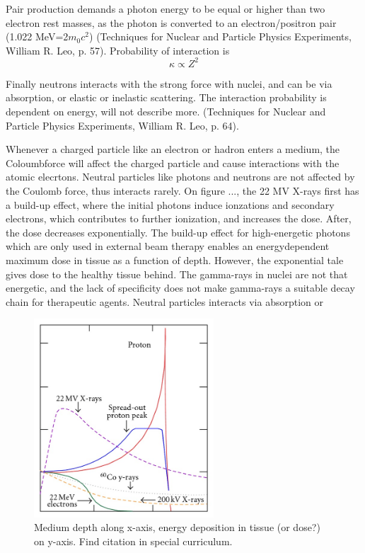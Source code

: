 Pair production demands a photon energy to be equal or higher than two electron rest  masses, as the photon is converted to an electron/positron pair (1.022 MeV=2$m_0c^2$) (Techniques for Nuclear and Particle Physics Experiments, William R. Leo, p. 57). Probability of interaction is \begin{equation}
    \kappa\propto Z^2
\end{equation}

Finally neutrons interacts with the strong force with nuclei, and can be via absorption, or elastic or inelastic scattering. The interaction probability is dependent on energy, will not describe more. (Techniques for Nuclear and Particle Physics Experiments, William R. Leo, p. 64). 

Whenever a charged particle like an electron or hadron enters a medium, the Coloumbforce will affect the charged particle and cause interactions with the atomic elecrtons. Neutral particles like photons and neutrons are not affected by the Coulomb force, thus interacts rarely. On figure ..., the 22 MV X-rays first has a build-up effect, where the initial photons induce ionzations and secondary electrons, which contributes to further ionization, and increases the dose. After, the dose decreases exponentially. 
The build-up effect for high-energetic photons which are only used in external beam therapy enables an energydependent maximum dose in tissue as a function of depth. However, the exponential tale gives dose to the healthy tissue behind. The gamma-rays in nuclei are not that energetic, and the lack of specificity does not make gamma-rays a suitable decay chain for therapeutic agents. Neutral particles interacts via absorption or   \\



\begin{figure}
    \centering
    \includegraphics[width=0.6\textwidth]{Theory/Bragg-peak-and-Spread-Out-Bragg-Peak-SOBP-for-a-proton-beam-in-comparison-with-photon.jpg}
    \caption{Medium depth along x-axis, energy deposition in tissue (or dose?) on y-axis. Find citation in special curriculum. }
    \label{fig:particle_interaction}
\end{figure}




